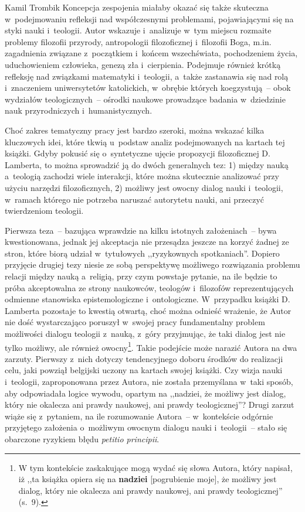 \begin{recplenv}{Kamil Trombik}
Koncepcja zespojenia miałaby okazać się także skuteczna w~podejmowaniu refleksji nad współczesnymi problemami,
pojawiającymi się na styki nauki i~teologii. Autor wskazuje i~analizuje w~tym miejscu rozmaite problemy filozofii
przyrody, antropologii filozoficznej i~filozofii Boga, m.in. zagadnienia związane z~początkiem i~końcem wszechświata,
pochodzeniem życia, uduchowieniem człowieka, genezą zła i~cierpienia. Podejmuje również krótką refleksję nad związkami
matematyki i~teologii, a~także zastanawia się nad rolą i~znaczeniem uniwersytetów katolickich, w~obrębie których
koegzystują~-- obok wydziałów teologicznych~-- ośrodki naukowe prowadzące badania w~dziedzinie nauk
przyrodniczych i~humanistycznych.

Choć zakres tematyczny pracy jest bardzo szeroki, można wskazać kilka kluczowych idei, które tkwią u~podstaw analiz
podejmowanych na kartach tej książki. Gdyby pokusić się o~syntetyczne ujęcie propozycji filozoficznej D. Lamberta, to
można sprowadzić ją do dwóch generalnych tez: 1) między nauką a~teologią zachodzi wiele interakcji, które można
skutecznie analizować przy użyciu narzędzi filozoficznych, 2) możliwy jest owocny dialog nauki i~teologii, w~ramach
którego nie potrzeba naruszać autorytetu nauki, ani przeczyć twierdzeniom teologii.

\enlargethispage{-.5\baselineskip}

Pierwsza teza~-- bazująca wprawdzie na kilku istotnych założeniach~-- bywa kwestionowana, jednak jej akceptacja nie
przesądza jeszcze na korzyć żadnej ze stron, które biorą udział w~tytułowych ,,ryzykownych spotkaniach''. Dopiero
przyjęcie drugiej tezy niesie ze sobą perspektywę możliwego rozwiązania problemu relacji między nauką a~religią, przy
czym powstaje pytanie, na ile będzie to próba akceptowalna ze strony naukowców, teologów i~filozofów reprezentujących
odmienne stanowiska epistemologiczne i~ontologiczne. W~przypadku książki D. Lamberta pozostaje to kwestią otwartą, choć
można odnieść wrażenie, że Autor nie dość wystarczająco poruszył w~swojej pracy fundamentalny problem możliwości
dialogu teologii z~nauką, z~góry przyjmując, że taki dialog jest nie tylko możliwy, ale również owocny\footnote{W tym
kontekście zaskakujące mogą wydać się słowa Autora, który napisał, iż ,,ta książka opiera się na \textbf{nadziei}
[pogrubienie moje], że możliwy jest dialog, który nie okalecza ani prawdy naukowej, ani prawdy teologicznej'' (s.~9).}.
Takie podejście może narazić Autora na dwa zarzuty. Pierwszy z~nich dotyczy tendencyjnego doboru środków do realizacji
celu, jaki powziął belgijski uczony na kartach swojej książki. Czy wizja nauki i~teologii, zaproponowana przez Autora,
nie została przemyślana w~taki sposób, aby odpowiadała logice wywodu, opartym na ,,nadziei, że możliwy jest dialog,
który nie okalecza ani prawdy naukowej, ani prawdy teologicznej''? Drugi zarzut wiąże się z~pytaniem, na ile rozumowanie
Autora~-- w~kontekście odgórnie przyjętego założenia o~możliwym owocnym dialogu nauki i~teologii~-- stało się obarczone
ryzykiem błędu \textit{petitio principii}.


\end{recplenv}

